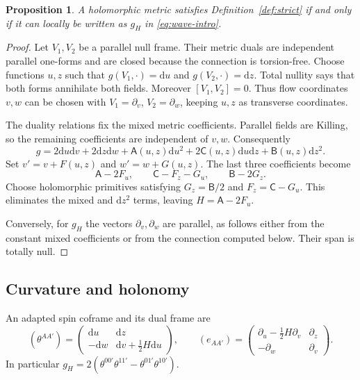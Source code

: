 \documentclass[11pt]{article}
\numberwithin{equation}{section}
\newtheorem{proposition}[theorem]{Proposition}
\theoremstyle{definition}
\theoremstyle{remark}
\newcommand{\dd}{\mathrm d}
\begin{document}
\begin{proposition}\label{prop:normalform}
A holomorphic metric satisfies Definition~\ref{def:strict} if and only if it can locally be written as $g_H$ in \eqref{eq:wave-intro}.
\end{proposition}
\begin{proof}
Let $V_1,V_2$ be a parallel null frame. Their metric duals are independent parallel one-forms and are closed because the connection is torsion-free. Choose functions $u,z$ such that $g(V_1,\cdot)=\dd u$ and $g(V_2,\cdot)=\dd z$. Total nullity says that both forms annihilate both fields. Moreover $[V_1,V_2]=0$. Thus flow coordinates $v,w$ can be chosen with $V_1=\partial_v$, $V_2=\partial_w$, keeping $u,z$ as transverse coordinates.

The duality relations fix the mixed metric coefficients. Parallel fields are Killing, so the remaining coefficients are independent of $v,w$. Consequently
\begin{equation}\label{eq:strict-general}
g=2\dd u\dd v+2\dd z\dd w+\mathsf A(u,z)\dd u^2
  +2\mathsf C(u,z)\dd u\dd z+\mathsf B(u,z)\dd z^2.
\end{equation}
Set $v'=v+F(u,z)$ and $w'=w+G(u,z)$. The last three coefficients become
\[
\mathsf A-2F_u,\qquad \mathsf C-F_z-G_u,\qquad \mathsf B-2G_z.
\]
Choose holomorphic primitives satisfying $G_z=\mathsf B/2$ and $F_z=\mathsf C-G_u$. This eliminates the mixed and $\dd z^2$ terms, leaving $H=\mathsf A-2F_u$.

Conversely, for $g_H$ the vectors $\partial_v,\partial_w$ are parallel, as follows either from the constant mixed coefficients or from the connection computed below. Their span is totally null.
\end{proof}

\subsection{Curvature and holonomy}

An adapted spin coframe and its dual frame are
\begin{equation}\label{eq:coframe}
(\theta^{AA'})=
\begin{pmatrix}\dd u&\dd z\\-\dd w&\dd v+\frac12H\dd u\end{pmatrix},
\qquad
(e_{AA'})=
\begin{pmatrix}\partial_u-\frac12H\partial_v&\partial_z\\
-\partial_w&\partial_v\end{pmatrix}.
\end{equation}
In particular $g_H=2(\theta^{00'}\theta^{11'}-\theta^{01'}\theta^{10'})$.
\end{document}
